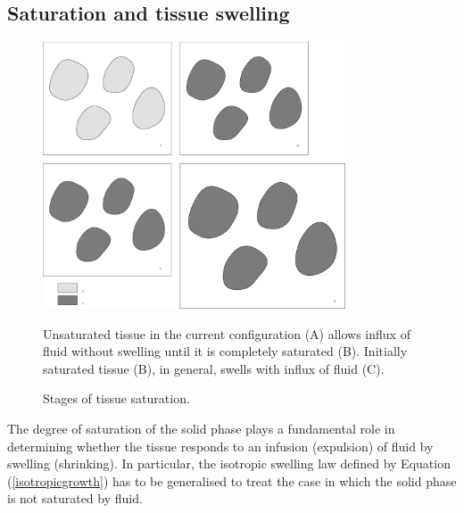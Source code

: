 \subsection{Saturation and tissue swelling}
\label{saturation-and-tissue-swelling}

\begin{figure}[ht]
  \begin{center}
    \includegraphics[width=0.8\textwidth]
                    {images/elucidation/saturation-stages}
    \caption{Stages of tissue saturation.}
  \end{center}
      {Unsaturated tissue in the current configuration (A) allows
        influx of fluid without swelling until it is completely
        saturated (B). Initially saturated tissue (B), in general,
        swells with influx of fluid (C).}
      \label{saturation-and-swelling}
\end{figure}

\noindent The degree of saturation of the solid phase plays a
fundamental role in determining whether the tissue responds to an
infusion (expulsion) of fluid by swelling (shrinking). In 
particular, the isotropic swelling law defined by Equation
(\ref{isotropicgrowth}) has to be generalised to treat the case in
which the solid phase is not saturated by fluid.

